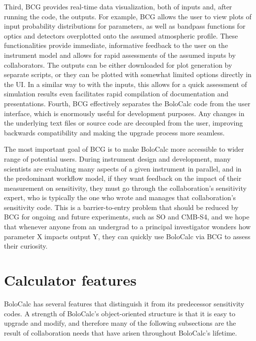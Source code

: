 Third, BCG provides real-time data visualization, both of inputs and, after running the code, the outputs. For example, BCG allows the user to view plots of input probability distributions for parameters, as well as bandpass functions for optics and detectors overplotted onto the assumed atmospheric profile. These functionalities provide immediate, informative feedback to the user on the instrument model and allows for rapid assessments of the assumed inputs by collaborators. The outputs can be either downloaded for plot generation by separate scripts, or they can be plotted with somewhat limited options directly in the UI. In a similar way to with the inputs, this allows for a quick assessment of simulation results even facilitates rapid compilation of documentation and presentations. Fourth, BCG effectively separates the BoloCalc code from the user interface, which is enormously useful for development purposes. Any changes in the underlying text files or source code are decoupled from the user, improving backwards compatibility and making the upgrade process more seamless. 

The most important goal of BCG is to make BoloCalc more accessible to wider range of potential users. During instrument design and development, many scientists are evaluating many aspects of a given instrument in parallel, and in the predominant workflow model, if they want feedback on the impact of their measurement on sensitivity, they must go through the collaboration's sensitivity expert, who is typically the one who wrote and manages that collaboration's sensitivity code. This is a barrier-to-entry problem that should be reduced by BCG for ongoing and future experiments, such as SO and CMB-S4, and we hope that whenever anyone from an undergrad to a principal investigator wonders how parameter X impacts output Y, they can quickly use BoloCalc via BCG to assess their curiosity.



\section{Calculator features}
\label{sec:bolocalc_features}

BoloCalc has several features that distinguish it from its predecessor sensitivity codes. A strength of BoloCalc's object-oriented structure is that it is easy to upgrade and modify, and therefore many of the following subsections are the result of collaboration needs that have arisen throughout BoloCalc's lifetime.

